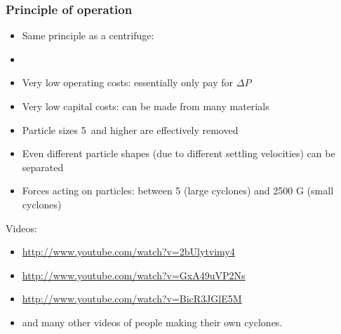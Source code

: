 \begin{frame}\frametitle{Principle of operation}
	\begin{itemize}
		\item	Same principle as a centrifuge: \textbf{{\color{myGreen}{density difference required}}}
		\item	{\color{myOrange}{No moving parts!}}
		\item	Very low operating costs: essentially only pay for $\Delta P$
		\item	Very low capital costs: can be made from many materials
		\item	Particle sizes 5\micron\, and higher are effectively removed
		\item	Even different particle shapes (due to different settling velocities) can be separated
		\item	Forces acting on particles: between 5 (large cyclones) and 2500 G (small cyclones)
	\end{itemize}	
	\vspace{12pt}
	Videos:
	\begin{itemize}
		\item	\href{http://www.youtube.com/watch?v=2bUlytvimy4}{http://www.youtube.com/watch?v=2bUlytvimy4}
		\item	\href{http://www.youtube.com/watch?v=GxA49uVP2Ns}{http://www.youtube.com/watch?v=GxA49uVP2Ns}
		\item	\href{http://www.youtube.com/watch?v=BicR3JGlE5M}{http://www.youtube.com/watch?v=BicR3JGlE5M}
		\item	and many other videos of people making their own cyclones.
	\end{itemize}
\end{frame}

